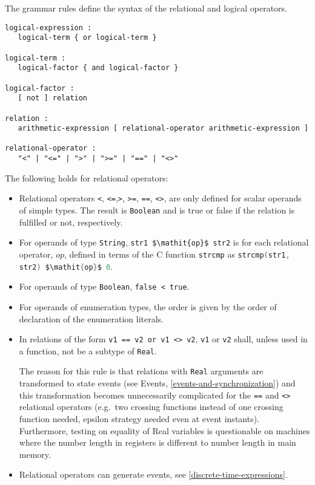 The grammar rules define the syntax of the relational and logical
operators.

\begin{lstlisting}[language=grammar]
logical-expression :
   logical-term { or logical-term }

logical-term :
   logical-factor { and logical-factor }

logical-factor :
   [ not ] relation

relation :
   arithmetic-expression [ relational-operator arithmetic-expression ]

relational-operator :
   "<" | "<=" | ">" | ">=" | "==" | "<>"
\end{lstlisting}

The following holds for relational operators:
\begin{itemize}
\item
  Relational operators \lstinline!<!, \lstinline!<=!,\lstinline!>!,
\lstinline!>=!, \lstinline!==!, \lstinline!<>!, are only defined for
  scalar operands of simple types. The result is \lstinline!Boolean! and is true or
  false if the relation is fulfilled or not, respectively.
\item
  For operands of type \lstinline!String!, \lstinline!str1 $\mathit{op}$ str2! is for each relational
  operator, $\mathit{op}$, defined in terms of the C function \lstinline[language=C]!strcmp! as
  \lstinline[language=C]!strcmp(str1, str2) $\mathit{op}$ 0!.
\item
  For operands of type \lstinline!Boolean!, \lstinline!false < true!.
\item
  For operands of enumeration types, the order is given by the order of
  declaration of the enumeration literals.
\item
  In relations of the form \lstinline!v1 == v2 or v1 <> v2!,
  \lstinline!v1! or \lstinline!v2! shall, unless used in a function, not be a subtype of \lstinline!Real!.
  \begin{nonnormative}
  The reason for this rule is that relations with \lstinline!Real! arguments are transformed to state events (see Events, \cref{events-and-synchronization})
  and this transformation becomes unnecessarily complicated for the \lstinline!==! and \lstinline!<>! relational operators (e.g.\ two crossing functions instead
  of one crossing function needed, epsilon strategy needed even at event instants). Furthermore, testing on equality of Real variables is questionable on machines
  where the number length in registers is different to number length in main memory.
  \end{nonnormative}
\item
  Relational operators can generate events, see \cref{discrete-time-expressions}.
\end{itemize}

